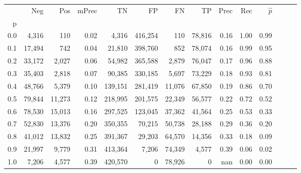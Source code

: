 \begin{tabular}{rrrrrrrrrrrrrr}
\toprule
{} &     Neg &     Pos & mPrec &       TN &       FP &      FN &      TP &  Prec &   Rec & $\hat{p}$ \\
p   &         &         &       &          &          &         &         &       &       &           \\
\midrule
0.0 &   4,316 &     110 &  0.02 &    4,316 &  416,254 &     110 &  78,816 &  0.16 &  1.00 &      0.99 \\
0.1 &  17,494 &     742 &  0.04 &   21,810 &  398,760 &     852 &  78,074 &  0.16 &  0.99 &      0.95 \\
0.2 &  33,172 &   2,027 &  0.06 &   54,982 &  365,588 &   2,879 &  76,047 &  0.17 &  0.96 &      0.88 \\
0.3 &  35,403 &   2,818 &  0.07 &   90,385 &  330,185 &   5,697 &  73,229 &  0.18 &  0.93 &      0.81 \\
0.4 &  48,766 &   5,379 &  0.10 &  139,151 &  281,419 &  11,076 &  67,850 &  0.19 &  0.86 &      0.70 \\
0.5 &  79,844 &  11,273 &  0.12 &  218,995 &  201,575 &  22,349 &  56,577 &  0.22 &  0.72 &      0.52 \\
0.6 &  78,530 &  15,013 &  0.16 &  297,525 &  123,045 &  37,362 &  41,564 &  0.25 &  0.53 &      0.33 \\
0.7 &  52,830 &  13,376 &  0.20 &  350,355 &   70,215 &  50,738 &  28,188 &  0.29 &  0.36 &      0.20 \\
0.8 &  41,012 &  13,832 &  0.25 &  391,367 &   29,203 &  64,570 &  14,356 &  0.33 &  0.18 &      0.09 \\
0.9 &  21,997 &   9,779 &  0.31 &  413,364 &    7,206 &  74,349 &   4,577 &  0.39 &  0.06 &      0.02 \\
1.0 &   7,206 &   4,577 &  0.39 &  420,570 &        0 &  78,926 &       0 &   nan &  0.00 &      0.00 \\
\bottomrule
\end{tabular}
